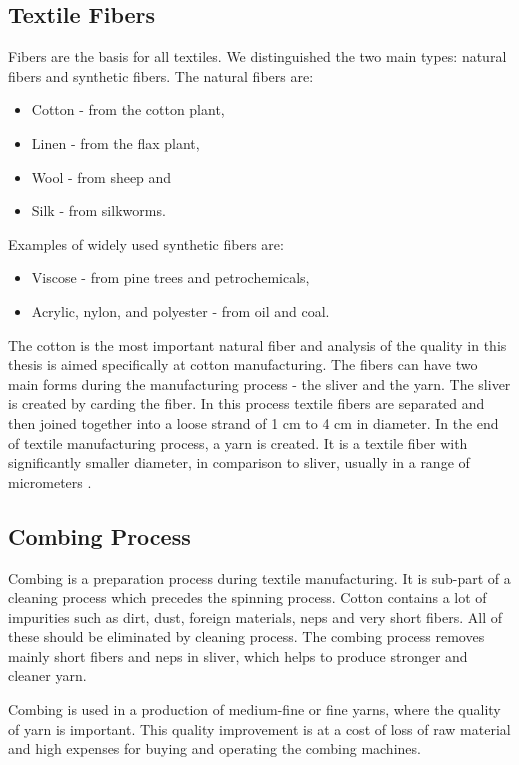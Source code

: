 \documentclass[twoside]{ctuthesis}
\theoremstyle{plain}
\theoremstyle{definition}
\theoremstyle{note}
\begin{document}
\subsection{Textile Fibers}
\label{textileFibers}
Fibers are the basis for all textiles. We distinguished the two main types: natural fibers and synthetic fibers. The natural fibers are:
\begin{itemize}
	\setlength{\itemsep}{5pt}
\item Cotton - from the cotton plant,
\item Linen - from the flax plant,
\item Wool - from sheep and
\item Silk - from silkworms.
\end{itemize}
Examples of widely used synthetic fibers are:
\begin{itemize}
	\setlength{\itemsep}{5pt}
\item Viscose - from pine trees and petrochemicals,

\item Acrylic, nylon, and polyester - from oil and coal. 
\end{itemize}
The cotton is the most important natural fiber and analysis of the quality in this thesis is aimed specifically at cotton manufacturing. 
The fibers can have two main forms during the manufacturing process - the sliver and the yarn. The sliver is created by carding the fiber. In this process textile fibers are separated and then joined together into a loose strand of 1 cm to 4 cm in diameter. In the end of textile manufacturing process, a yarn is created. It is a textile fiber with significantly smaller diameter, in comparison to sliver, usually in a range of micrometers \cite{cite:FoFF}. 
\subsection{Combing Process}
\label{sec:Combing}
Combing is a preparation process during textile manufacturing. It is sub-part of a cleaning process which precedes the spinning process. Cotton contains a lot of impurities such as dirt, dust, foreign materials, neps and very short fibers. All of these should be eliminated by cleaning process. The combing process removes mainly short fibers and neps in sliver, which helps to produce stronger and cleaner yarn.

Combing is used in a production of medium-fine or fine yarns, where the quality of yarn is important. This quality improvement is at a cost of loss of raw material and high expenses for buying and operating the combing machines. 
\end{document}
